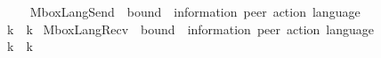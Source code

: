 \begin{isabellebody}
\ \ {\isachardoublequoteopen}{\isasymL}\isactrlsub {\isasyminfinity}\ {\isasymequiv}\ {\isasymL}\isactrlbsub {\isasyminfinity}\isactrlesub {\isachardoublequoteclose}\isanewline
\isanewline
{}\isamarkupfalse%
\ MboxLangSend\ {\isacharcolon}{\kern0pt}{\isacharcolon}{\kern0pt}\ {\isachardoublequoteopen}bound\ {\isasymRightarrow}\ {\isacharparenleft}{\kern0pt}{\isacharprime}{\kern0pt}information{\isacharcomma}{\kern0pt}\ {\isacharprime}{\kern0pt}peer{\isacharparenright}{\kern0pt}\ action\ language{\isachardoublequoteclose}\ \ {\isacharparenleft}{\kern0pt}{\isachardoublequoteopen}{\isasymL}\isactrlsub {\isacharbang}{\kern0pt}\isactrlbsub {\isacharunderscore}{\kern0pt}\isactrlesub {\isachardoublequoteclose}\ {\isacharbrackleft}{\kern0pt}{}{}{}{\isacharbrackright}{\kern0pt}\ {}{}{}{\isacharparenright}{\kern0pt}\isanewline
\ \ \isanewline
\ \ {\isachardoublequoteopen}{\isasymL}\isactrlsub {\isacharbang}{\kern0pt}\isactrlbsub k\isactrlesub \ {\isasymequiv}\ {\isacharparenleft}{\kern0pt}{\isasymL}\isactrlbsub k\isactrlesub {\isacharparenright}{\kern0pt}{\isasymdownharpoonright}\isactrlsub {\isacharbang}{\kern0pt}{\isachardoublequoteclose}\isanewline
\isanewline
{}\isamarkupfalse%
\ MboxLangRecv\ {\isacharcolon}{\kern0pt}{\isacharcolon}{\kern0pt}\ {\isachardoublequoteopen}bound\ {\isasymRightarrow}\ {\isacharparenleft}{\kern0pt}{\isacharprime}{\kern0pt}information{\isacharcomma}{\kern0pt}\ {\isacharprime}{\kern0pt}peer{\isacharparenright}{\kern0pt}\ action\ language{\isachardoublequoteclose}\ \ {\isacharparenleft}{\kern0pt}{\isachardoublequoteopen}{\isasymL}\isactrlsub {\isacharquery}{\kern0pt}\isactrlbsub {\isacharunderscore}{\kern0pt}\isactrlesub {\isachardoublequoteclose}\ {\isacharbrackleft}{\kern0pt}{}{}{}{\isacharbrackright}{\kern0pt}\ {}{}{}{\isacharparenright}{\kern0pt}\isanewline
\ \ \isanewline
\ \ {\isachardoublequoteopen}{\isasymL}\isactrlsub {\isacharquery}{\kern0pt}\isactrlbsub k\isactrlesub \ {\isasymequiv}\ {\isacharparenleft}{\kern0pt}{\isasymL}\isactrlbsub k\isactrlesub {\isacharparenright}{\kern0pt}{\isasymdownharpoonright}\isactrlsub {\isacharquery}{\kern0pt}{\isachardoublequoteclose}%
\isadelimdocument
%
\endisadelimdocument
%
\isatagdocument
%
\isamarkuptrue%
%
\endisatagdocument
{\isafolddocument}%
%
\isadelimdocument
%
\endisadelimdocument
{}\isamarkupfalse%

\end{isabellebody}
